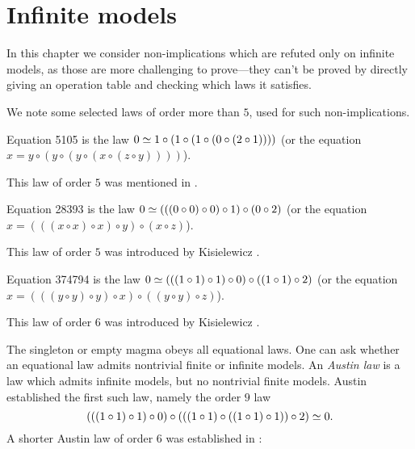 \chapter{Infinite models}

In this chapter we consider non-implications which are refuted only on infinite models, as those are
more challenging to prove---they can't be proved by directly giving an operation table and checking
which laws it satisfies.

We note some selected laws of order more than $5$, used for such non-implications.

\begin{definition}[Equation 5105]
  \label{eq5105}
  Equation 5105 is the law $0  \simeq 1 \circ (1 \circ (1 \circ (0 \circ (2 \circ 1))))$ (or the equation $x = y \circ (y \circ (y \circ (x \circ (z \circ y))))$).
\end{definition}

This law of order $5$ was mentioned in \cite{Kisielewicz2}.

\begin{definition}[Equation 28393]
  \label{eq28393}
  Equation 28393 is the law $0  \simeq  (((0 \circ 0) \circ 0) \circ 1) \circ (0 \circ 2)$ (or the equation $x = (((x \circ x) \circ x) \circ y) \circ (x \circ z)$).
\end{definition}

This law of order $5$ was introduced by Kisielewicz \cite{Kisielewicz}.

\begin{definition}[Equation 374794]
  \leanok
  \label{eq374794}
  Equation 374794 is the law $0  \simeq  (((1 \circ 1) \circ 1) \circ 0) \circ ((1 \circ 1) \circ 2)$ (or the equation $x = (((y \circ y) \circ y) \circ x) \circ ((y \circ y) \circ z)$).
\end{definition}

This law of order $6$ was introduced by Kisielewicz \cite{Kisielewicz}.

The singleton or empty magma obeys all equational laws.  One can ask whether an equational law admits nontrivial finite or infinite models.  An \emph{Austin law} is a law which admits infinite models, but no nontrivial finite models.  Austin \cite{austin} established the first such law, namely the order $9$ law
$$ (((1 \circ 1) \circ 1) \circ 0) \circ (((1 \circ 1) \circ ((1 \circ 1) \circ 1)) \circ 2) \simeq 0.$$
A shorter Austin law of order $6$ was established in \cite{Kisielewicz}:

